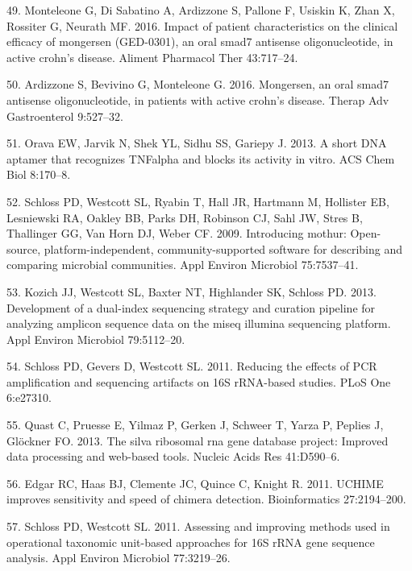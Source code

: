 \documentclass[11pt,]{article}
\begin{document}
\hypertarget{ref-monteleone_mongersen_2016}{}
49. Monteleone G, Di Sabatino A, Ardizzone S, Pallone F, Usiskin K, Zhan
X, Rossiter G, Neurath MF. 2016. Impact of patient characteristics on
the clinical efficacy of mongersen (GED-0301), an oral smad7 antisense
oligonucleotide, in active crohn's disease. Aliment Pharmacol Ther
43:717--24.

\hypertarget{ref-ardizzone_mongersen_2016}{}
50. Ardizzone S, Bevivino G, Monteleone G. 2016. Mongersen, an oral
smad7 antisense oligonucleotide, in patients with active crohn's
disease. Therap Adv Gastroenterol 9:527--32.

\hypertarget{ref-orava_short_2013}{}
51. Orava EW, Jarvik N, Shek YL, Sidhu SS, Gariepy J. 2013. A short DNA
aptamer that recognizes TNFalpha and blocks its activity in vitro. ACS
Chem Biol 8:170--8.

\hypertarget{ref-schloss_mothur_2009}{}
52. Schloss PD, Westcott SL, Ryabin T, Hall JR, Hartmann M, Hollister
EB, Lesniewski RA, Oakley BB, Parks DH, Robinson CJ, Sahl JW, Stres B,
Thallinger GG, Van Horn DJ, Weber CF. 2009. Introducing mothur:
Open-source, platform-independent, community-supported software for
describing and comparing microbial communities. Appl Environ Microbiol
75:7537--41.

\hypertarget{ref-Kozich_MiSeqSOP_2013}{}
53. Kozich JJ, Westcott SL, Baxter NT, Highlander SK, Schloss PD. 2013.
Development of a dual-index sequencing strategy and curation pipeline
for analyzing amplicon sequence data on the miseq illumina sequencing
platform. Appl Environ Microbiol 79:5112--20.

\hypertarget{ref-schloss_PCRartifacts_2011}{}
54. Schloss PD, Gevers D, Westcott SL. 2011. Reducing the effects of PCR
amplification and sequencing artifacts on 16S rRNA-based studies. PLoS
One 6:e27310.

\hypertarget{ref-Quast_silva_2013}{}
55. Quast C, Pruesse E, Yilmaz P, Gerken J, Schweer T, Yarza P, Peplies
J, Glöckner FO. 2013. The silva ribosomal rna gene database project:
Improved data processing and web-based tools. Nucleic Acids Res
41:D590--6.

\hypertarget{ref-edgar_uchime_2011}{}
56. Edgar RC, Haas BJ, Clemente JC, Quince C, Knight R. 2011. UCHIME
improves sensitivity and speed of chimera detection. Bioinformatics
27:2194--200.

\hypertarget{ref-schloss_OTUanalysis_2011}{}
57. Schloss PD, Westcott SL. 2011. Assessing and improving methods used
in operational taxonomic unit-based approaches for 16S rRNA gene
sequence analysis. Appl Environ Microbiol 77:3219--26.
\end{document}

